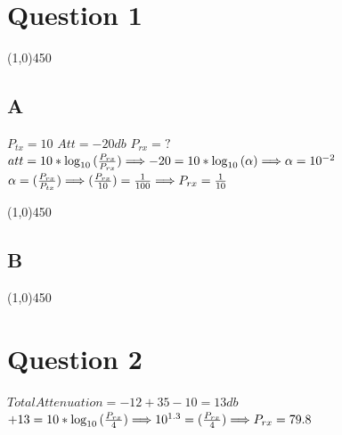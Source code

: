 \documentclass[a4paper,12pt]{book}
\begin{document}
\section {Question 1 }
\line(1,0){450}
\subsection{A}
\begin{doublespace}

 $ P_{tx} = 10 $\nnl
 $Att = -20 db$ \nnl
$P_{rx} = ? $ \nnl
\noindent $ att = 10 * \log_{10} {(\frac {P_{rx}}{P_{rx}})}  \Longrightarrow -20 =  10 * \log_{10} {(\alpha)}   \Longrightarrow   \alpha = 10^{-2}          $ \nnl
$ \alpha = (\frac {P_{rx}}{P_{tx}})  \Longrightarrow (\frac {P_{rx}}{10})  =   \frac {1}{100}   \Longrightarrow   P_{rx} =  \frac {1}{10} $\nnl
\end{doublespace}

\line(1,0){450}
\subsection{B}
\line(1,0){450}

\section {Question 2 }
\begin{doublespace}
$Total Attenuation = -12 + 35 - 10 = 13 db $ \\
$+13 = 10 * \log_{10} {(\frac {P_{rx}}{4})}  \Longrightarrow 10^{1.3} = (\frac {P_{rx}}{4}) \Longrightarrow P_{rx} = 79.8 $
\end{doublespace}
\end{document}
